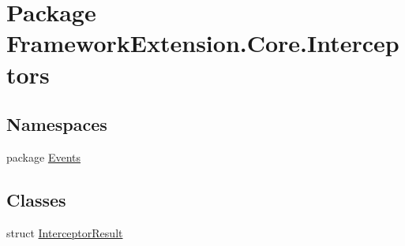 \hypertarget{namespace_framework_extension_1_1_core_1_1_interceptors}{\section{Package Framework\-Extension.\-Core.\-Interceptors}
\label{namespace_framework_extension_1_1_core_1_1_interceptors}
}
\subsection*{Namespaces}
\begin{DoxyCompactItemize}
\item 
package \hyperlink{namespace_framework_extension_1_1_core_1_1_interceptors_1_1_events}{Events}
\end{DoxyCompactItemize}
\subsection*{Classes}
\begin{DoxyCompactItemize}
\item 
struct \hyperlink{struct_framework_extension_1_1_core_1_1_interceptors_1_1_interceptor_result}{Interceptor\-Result}
\end{DoxyCompactItemize}
